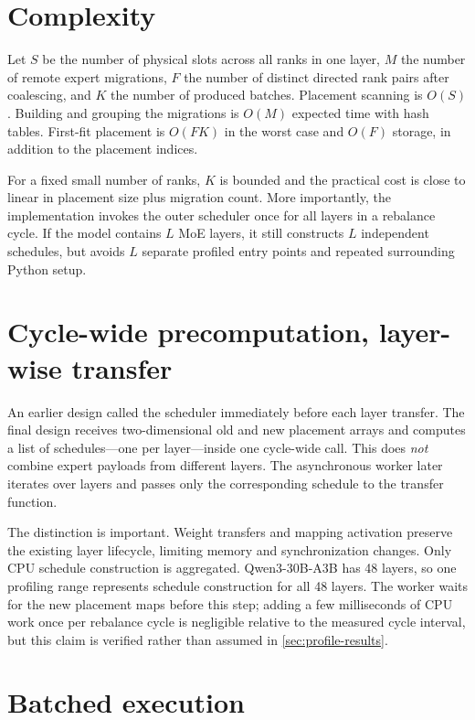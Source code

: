 \section{Complexity}

Let $S$ be the number of physical slots across all ranks in one layer, $M$ the
number of remote expert migrations, $F$ the number of distinct directed rank
pairs after coalescing, and $K$ the number of produced batches. Placement
scanning is $O(S)$. Building and grouping the migrations is $O(M)$ expected
time with hash tables. First-fit placement is $O(FK)$ in the worst case and
$O(F)$ storage, in addition to the placement indices.

For a fixed small number of ranks, $K$ is bounded and the practical cost is
close to linear in placement size plus migration count. More importantly, the
implementation invokes the outer scheduler once for all layers in a rebalance
cycle. If the model contains $L$ MoE layers, it still constructs $L$
independent schedules, but avoids $L$ separate profiled entry points and
repeated surrounding Python setup.

\section{Cycle-wide precomputation, layer-wise transfer}

An earlier design called the scheduler immediately before each layer transfer.
The final design receives two-dimensional old and new placement arrays and
computes a list of schedules---one per layer---inside one cycle-wide call. This
does \emph{not} combine expert payloads from different layers. The asynchronous
worker later iterates over layers and passes only the corresponding schedule to
the transfer function.

The distinction is important. Weight transfers and mapping activation preserve
the existing layer lifecycle, limiting memory and synchronization changes.
Only CPU schedule construction is aggregated. Qwen3-30B-A3B has 48 layers, so
one profiling range represents schedule construction for all 48 layers. The
worker waits for the new placement maps before this step; adding a few
milliseconds of CPU work once per rebalance cycle is negligible relative to
the measured cycle interval, but this claim is verified rather than assumed in
\cref{sec:profile-results}.

\section{Batched execution}

